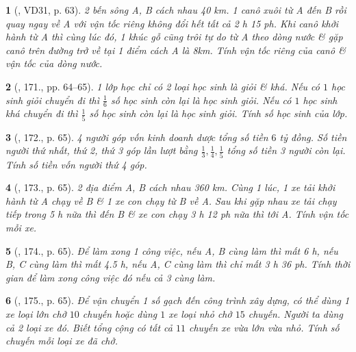 \documentclass{article}
\newtheorem{baitoan}{}
\begin{document}
\begin{baitoan}[\cite{Tuyen_Toan_9_old}, VD31, p. 63]
	2 bến sông A, B cách nhau {\rm40 km}. 1 canô xuôi từ A đến B rồi quay ngay về A với vận tốc riêng không đổi hết tất cả {\rm2 h 15 ph}. Khi canô khởi hành từ A thì cùng lúc đó, 1 khúc gỗ cũng trôi tự do từ A theo dòng nước \& gặp canô trên đường trở về tại 1 điểm cách A là {\rm 8km}. Tính vận tốc riêng của canô \& vận tốc của dòng nước.
\end{baitoan}

\begin{baitoan}[\cite{Tuyen_Toan_9_old}, 171., pp. 64--65]
	1 lớp học chỉ có 2 loại học sinh là giỏi \& khá. Nếu có $1$ học sinh giỏi chuyển đi thì $\frac{1}{6}$ số học sinh còn lại là học sinh giỏi. Nếu có $1$ học sinh khá chuyển đi thì $\frac{1}{5}$ số học sinh còn lại là học sinh giỏi. Tính số học sinh của lớp.
\end{baitoan}

\begin{baitoan}[\cite{Tuyen_Toan_9_old}, 172., p. 65]
	4 người góp vốn kinh doanh dược tổng số tiền $6$ tỷ đồng. Số tiền người thứ nhất, thứ 2, thứ 3 góp lần lượt bằng $\frac{1}{3},\frac{1}{4},\frac{1}{5}$ tổng số tiền 3 người còn lại. Tính số tiền vốn người thứ 4 góp.
\end{baitoan}

\begin{baitoan}[\cite{Tuyen_Toan_9_old}, 173., p. 65]
	2 địa điểm A, B cách nhau {\rm360 km}. Cùng 1 lúc, 1 xe tải khởi hành từ A chạy về B \& 1 xe con chạy từ B về A. Sau khi gặp nhau xe tải chạy tiếp trong {\rm5 h} nữa thì đến B \& xe con chạy {\rm3 h 12 ph} nữa thì tới A. Tính vận tốc mỗi xe.
\end{baitoan}

\begin{baitoan}[\cite{Tuyen_Toan_9_old}, 174., p. 65]
	Để làm xong 1 công việc, nếu A, B cùng làm thì mất {\rm6 h}, nếu B, C cùng làm thì mất {\rm4.5 h}, nếu A, C cùng làm thì chỉ mất {\rm3 h 36 ph}. Tính thời gian để làm xong công việc đó nếu cả 3 cùng làm.
\end{baitoan}

\begin{baitoan}[\cite{Tuyen_Toan_9_old}, 175., p. 65]
	Để vận chuyển 1 số gạch đến công trình xây dựng, có thể dùng 1 xe loại lớn chở $10$ chuyến hoặc dùng $1$ xe loại nhỏ chở $15$ chuyến. Người ta dùng cả 2 loại xe đó. Biết tổng cộng có tất cả $11$ chuyến xe vừa lớn vừa nhỏ. Tính số chuyến mỗi loại xe đã chở.
\end{baitoan}
\end{document}
